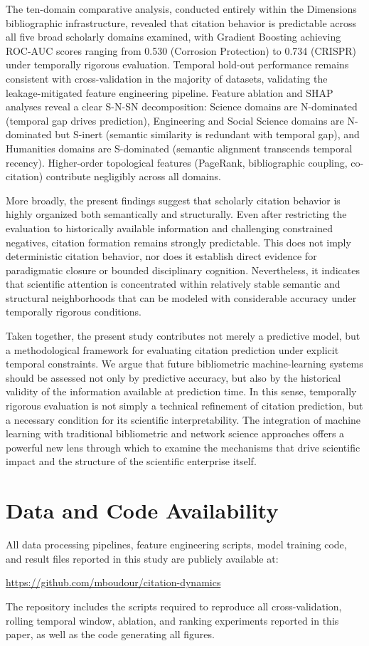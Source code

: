 \documentclass[11pt,a4paper]{article}
\begin{document}
The ten-domain comparative analysis, conducted entirely within the Dimensions bibliographic infrastructure, revealed that citation behavior is predictable across all five broad scholarly domains examined, with Gradient Boosting achieving ROC-AUC scores ranging from 0.530 (Corrosion Protection) to 0.734 (CRISPR) under temporally rigorous evaluation. Temporal hold-out performance remains consistent with cross-validation in the majority of datasets, validating the leakage-mitigated feature engineering pipeline. Feature ablation and SHAP analyses reveal a clear S-N-SN decomposition: Science domains are N-dominated (temporal gap drives prediction), Engineering and Social Science domains are N-dominated but S-inert (semantic similarity is redundant with temporal gap), and Humanities domains are S-dominated (semantic alignment transcends temporal recency). Higher-order topological features (PageRank, bibliographic coupling, co-citation) contribute negligibly across all domains.

More broadly, the present findings suggest that scholarly citation behavior is highly organized both semantically and structurally. Even after restricting the evaluation to historically available information and challenging constrained negatives, citation formation remains strongly predictable. This does not imply deterministic citation behavior, nor does it establish direct evidence for paradigmatic closure or bounded disciplinary cognition. Nevertheless, it indicates that scientific attention is concentrated within relatively stable semantic and structural neighborhoods that can be modeled with considerable accuracy under temporally rigorous conditions.

Taken together, the present study contributes not merely a predictive model, but a methodological framework for evaluating citation prediction under explicit temporal constraints. We argue that future bibliometric machine-learning systems should be assessed not only by predictive accuracy, but also by the historical validity of the information available at prediction time. In this sense, temporally rigorous evaluation is not simply a technical refinement of citation prediction, but a necessary condition for its scientific interpretability. The integration of machine learning with traditional bibliometric and network science approaches offers a powerful new lens through which to examine the mechanisms that drive scientific impact and the structure of the scientific enterprise itself.

\section*{Data and Code Availability}
All data processing pipelines, feature engineering scripts, model training
code, and result files reported in this study are publicly available at:
\begin{center}
\url{https://github.com/mboudour/citation-dynamics}
\end{center}
The repository includes the scripts required to reproduce all
cross-validation, rolling temporal window, ablation, and ranking
experiments reported in this paper, as well as the code generating
all figures.



\end{document}
